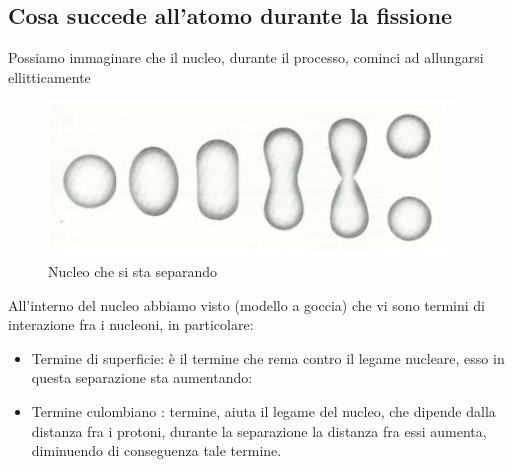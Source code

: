 \subsection{Cosa succede all'atomo durante la fissione}
Possiamo immaginare che il nucleo, durante il processo, cominci ad allungarsi ellitticamente
\newpage
\begin{figure}[!h]
    \centering
    \includegraphics[scale=0.5]{ch6InterazioneMateria/NucleoFissione}
    \caption{Nucleo che si sta separando}
\end{figure}

All'interno del nucleo abbiamo visto (modello a goccia) che vi sono termini di interazione fra i 
nucleoni, in particolare:
\begin{itemize}
        \item Termine di superficie: è il termine che rema contro il legame nucleare, esso 
                in questa separazione sta aumentando:
        \item Termine culombiano : termine, aiuta il legame del nucleo, che dipende dalla distanza fra i protoni, durante la 
                separazione la distanza fra essi aumenta, diminuendo di conseguenza tale termine.
\end{itemize}

